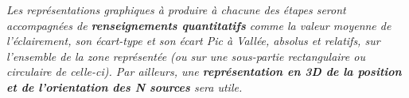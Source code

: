 \documentclass[10pt]{article} %
\def\dirName{6N-ONIP-bloc4_sujetA}
\begin{document}
\begin{minipage}[t]{.30\linewidth} %


\hfill


\end{minipage} %

\newpage

\hypertarget{stepbystep}{}

\textit{Les représentations graphiques à produire à chacune des étapes seront accompagnées de \textbf{renseignements quantitatifs} comme la valeur moyenne de l'éclairement, son écart-type et son écart Pic à Vallée, absolus et relatifs, sur l'ensemble de la zone représentée (ou sur une sous-partie rectangulaire ou circulaire de celle-ci). Par ailleurs, une \textbf{représentation en 3D de la position et de l'orientation des N sources} sera utile.}

\qquad

\qquad
\end{document}
